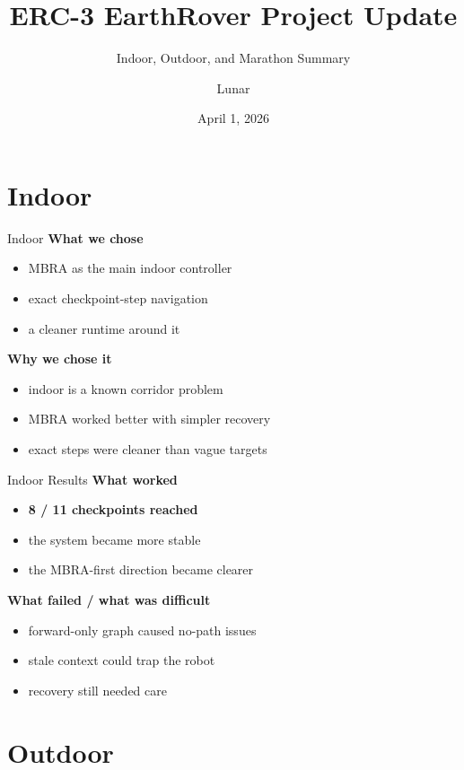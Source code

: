 \documentclass{beamer}
\title[EarthRover Update]{ERC-3 EarthRover Project Update}
\subtitle{Indoor, Outdoor, and Marathon Summary}
\author{Lunar}
\institute[NYU]{New York University}
\date{April 1, 2026}
\begin{document}
\begin{frame}
  \titlepage
\end{frame}

\section{Indoor}

\begin{frame}{Indoor}
\textbf{What we chose}
\begin{itemize}
  \item MBRA as the main indoor controller
  \item exact checkpoint-step navigation
  \item a cleaner runtime around it
\end{itemize}

\vspace{0.5em}
\textbf{Why we chose it}
\begin{itemize}
  \item indoor is a known corridor problem
  \item MBRA worked better with simpler recovery
  \item exact steps were cleaner than vague targets
\end{itemize}
\end{frame}

\begin{frame}{Indoor Results}
\textbf{What worked}
\begin{itemize}
  \item \textbf{8 / 11 checkpoints reached}
  \item the system became more stable
  \item the MBRA-first direction became clearer
\end{itemize}

\vspace{0.5em}
\textbf{What failed / what was difficult}
\begin{itemize}
  \item forward-only graph caused no-path issues
  \item stale context could trap the robot
  \item recovery still needed care
\end{itemize}
\end{frame}

\section{Outdoor}
\end{document}

